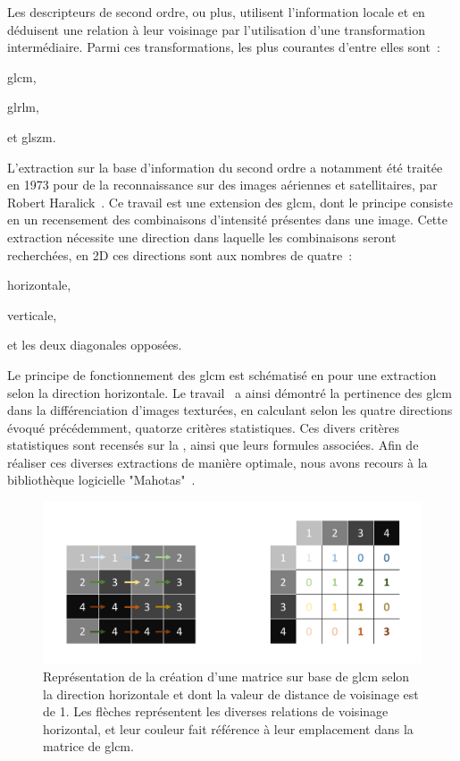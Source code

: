 Les descripteurs de second ordre, ou plus, utilisent l'information locale et en déduisent une relation à leur voisinage par l'utilisation d'une transformation intermédiaire. Parmi ces transformations, les plus courantes d'entre elles sont~: 
\begin{inlinerate}
    \item \gls{glcm},
    \item \gls{glrlm},
    \item et \gls{glszm}.
\end{inlinerate} 
L'extraction sur la base d'information du second ordre a notamment été traitée en 1973 pour de la reconnaissance sur des images aériennes et satellitaires, par Robert Haralick~\cite{Haralick1973}. Ce travail est une extension des \gls{glcm}, dont le principe consiste en un recensement des combinaisons d'intensité présentes dans une image. Cette extraction nécessite une direction dans laquelle les combinaisons seront recherchées, en 2D ces directions sont aux nombres de quatre~:
\begin{inlinerate}
    \item horizontale,
    \item verticale,
    \item et les deux diagonales opposées.
\end{inlinerate}
Le principe de fonctionnement des \gls{glcm} est schématisé en  pour une extraction selon la direction horizontale. Le travail~\cite{Haralick1973} a ainsi démontré la pertinence des \gls{glcm} dans la différenciation d'images texturées, en calculant selon les quatre directions évoqué précédemment, quatorze critères statistiques. Ces divers critères statistiques sont recensés sur la , ainsi que leurs formules associées. Afin de réaliser ces diverses extractions de manière optimale, nous avons recours à la bibliothèque logicielle "Mahotas"~\cite{coelho2012}.\par
 
\begin{figure}[H]
    \centering
    \includegraphics[width=\linewidth]{contents/chapter_4/resources/scheme_principle_GLCM.pdf}
    \caption{Représentation de la création d'une matrice sur base de \gls{glcm} selon la direction horizontale et dont la valeur de distance de voisinage est de 1. Les flèches représentent les diverses relations de voisinage horizontal, et leur couleur fait référence à leur emplacement dans la matrice de \gls{glcm}.}
    \label{fig:scheme_principle_GLCM}
\end{figure}\par

